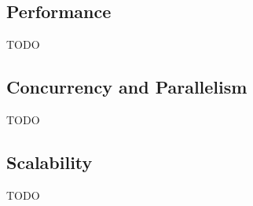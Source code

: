 \subsection{Performance}
TODO



\subsection{Concurrency and Parallelism}
TODO




\subsection{Scalability}
TODO






